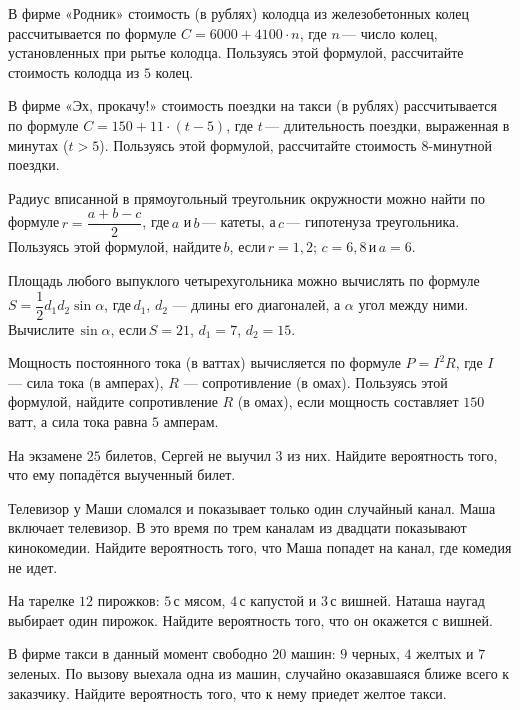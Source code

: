 \begin{class}[number=3]
	\begin{listofex}
		\item В фирме «Родник» стоимость (в рублях) колодца из железобетонных колец рассчитывается по формуле \( C=6000+4100\cdot n \), где \( n \) --- число колец, установленных при рытье колодца. Пользуясь этой формулой, рассчитайте стоимость колодца из \( 5 \) колец.
		\item В фирме «Эх, прокачу!» стоимость поездки на такси (в рублях) рассчитывается по формуле \( C=150+11\cdot(t-5) \), где \( t \) --- длительность поездки, выраженная в минутах (\( t>5 \)). Пользуясь этой формулой, рассчитайте стоимость \( 8 \)-минутной поездки.
		\item Радиус вписанной в прямоугольный треугольник окружности можно найти по формуле \( r=\dfrac{a+b-c}{2} \),  где \( a \) и \( b \) --- катеты, а \( c \) --- гипотенуза треугольника. Пользуясь этой формулой, найдите \( b \), если \( r=1,2 \); \( c=6,8 \) и \( a=6 \).
		\item Площадь любого выпуклого четырехугольника можно вычислять по формуле \( S=\dfrac{1}{2}d_1d_2\sin\alpha \),  где \( d_1 \), \( d_2 \) --- длины его диагоналей, а \( \alpha \) угол между ними. Вычислите \( \sin\alpha \), если \( S=21 \), \( d_1=7 \), \( d_2=15 \).
		\item Мощность постоянного тока (в ваттах) вычисляется по формуле \( P=I^2R \), где \( I \) --- сила тока (в амперах), \( R \) --- сопротивление (в омах). Пользуясь этой формулой, найдите сопротивление \( R \) (в омах), если мощность составляет \( 150 \) ватт, а сила тока равна \( 5 \) амперам.
		\item На экзамене \( 25 \) билетов, Сергей не выучил \( 3 \) из них. Найдите вероятность того, что ему попадётся выученный билет.
		\item Телевизор у Маши сломался и показывает только один случайный канал. Маша включает телевизор. В это время по трем каналам из двадцати показывают кинокомедии. Найдите вероятность того, что Маша попадет на канал, где комедия не идет.
		\item На тарелке \( 12 \) пирожков: \( 5 \) с мясом, \( 4 \) с капустой и \( 3 \) с вишней. Наташа наугад выбирает один пирожок. Найдите вероятность того, что он окажется с вишней.
		\item В фирме такси в данный момент свободно \( 20 \) машин: \( 9 \) черных, \( 4 \) желтых и \( 7 \) зеленых. По вызову выехала одна из машин, случайно оказавшаяся ближе всего к заказчику. Найдите вероятность того, что к нему приедет желтое такси.

\end{listofex}
\end{class}
